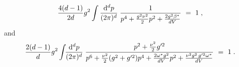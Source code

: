 \begin{equation}
\frac{4(d-1)}{2d}g^{2} \int \frac{\mathrm{d}^{d}p}{(2\pi)^{d}} \;  \frac{1}{p^{4}+\frac{g^{2}\nu^{2}}{2}p^{2} + \frac{2g^{2}\beta^{\ast}}{dV} } ~=~ 1   \;,
\label{beta gap eq}
\end{equation} 
and
\begin{equation}
\frac{2(d-1)}{d}g^{2}\int\!\! \frac{\mathrm{d}^{d}p}{(2\pi)^{d}} \; \frac{p^{2} + \frac{\nu^{2}}{2}g'^{2}}{p^{6} + \frac{\nu^{2}}{2}(g^{2} + g'^{2})p^{4} + \frac{2\omega^{\ast}g^{2}}{dV}p^{2} + \frac{\nu^{2}g^{2}\,g'^{2}\omega^{\ast}}{dV} } ~=~ 1 \;.
\label{omega gap eq}
\end{equation}
%

















